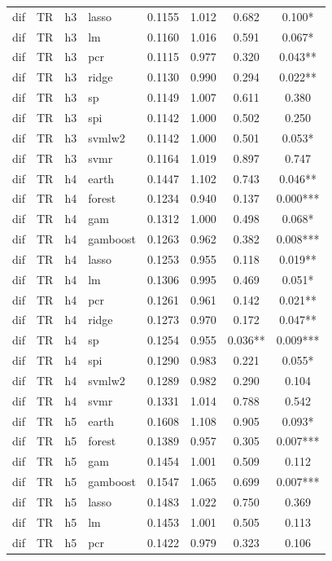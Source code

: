 \begin{ThreePartTable}
\begin{longtable}[t]{llclcccc}
dif & TR & h3 & lasso & 0.1155 & 1.012 & 0.682 & 0.100*\\
dif & TR & h3 & lm & 0.1160 & 1.016 & 0.591 & 0.067*\\
dif & TR & h3 & pcr & 0.1115 & 0.977 & 0.320 & 0.043**\\
dif & TR & h3 & ridge & 0.1130 & 0.990 & 0.294 & 0.022**\\
dif & TR & h3 & sp & 0.1149 & 1.007 & 0.611 & 0.380\\
dif & TR & h3 & spi & 0.1142 & 1.000 & 0.502 & 0.250\\
dif & TR & h3 & svmlw2 & 0.1142 & 1.000 & 0.501 & 0.053*\\
dif & TR & h3 & svmr & 0.1164 & 1.019 & 0.897 & 0.747\\
\addlinespace
dif & TR & h4 & earth & 0.1447 & 1.102 & 0.743 & 0.046**\\
dif & TR & h4 & forest & 0.1234 & 0.940 & 0.137 & 0.000***\\
dif & TR & h4 & gam & 0.1312 & 1.000 & 0.498 & 0.068*\\
dif & TR & h4 & gamboost & 0.1263 & 0.962 & 0.382 & 0.008***\\
dif & TR & h4 & lasso & 0.1253 & 0.955 & 0.118 & 0.019**\\
dif & TR & h4 & lm & 0.1306 & 0.995 & 0.469 & 0.051*\\
dif & TR & h4 & pcr & 0.1261 & 0.961 & 0.142 & 0.021**\\
dif & TR & h4 & ridge & 0.1273 & 0.970 & 0.172 & 0.047**\\
dif & TR & h4 & sp & 0.1254 & 0.955 & 0.036** & 0.009***\\
dif & TR & h4 & spi & 0.1290 & 0.983 & 0.221 & 0.055*\\
dif & TR & h4 & svmlw2 & 0.1289 & 0.982 & 0.290 & 0.104\\
dif & TR & h4 & svmr & 0.1331 & 1.014 & 0.788 & 0.542\\
\addlinespace
dif & TR & h5 & earth & 0.1608 & 1.108 & 0.905 & 0.093*\\
dif & TR & h5 & forest & 0.1389 & 0.957 & 0.305 & 0.007***\\
dif & TR & h5 & gam & 0.1454 & 1.001 & 0.509 & 0.112\\
dif & TR & h5 & gamboost & 0.1547 & 1.065 & 0.699 & 0.007***\\
dif & TR & h5 & lasso & 0.1483 & 1.022 & 0.750 & 0.369\\
dif & TR & h5 & lm & 0.1453 & 1.001 & 0.505 & 0.113\\
dif & TR & h5 & pcr & 0.1422 & 0.979 & 0.323 & 0.106\\

\end{longtable}
\end{ThreePartTable}
